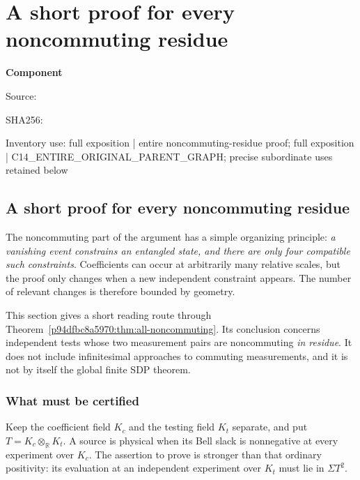 \chapter{A short proof for every noncommuting residue}
\label{component:p2c3fc22497a5}
\noindent\textbf{Component }\par
{\small\noindent Source: \par}
{\small\noindent SHA256: \par}
{\small\noindent Inventory use: full exposition | entire noncommuting-residue proof; full exposition | C14\_\allowbreak{}ENTIRE\_\allowbreak{}ORIGINAL\_\allowbreak{}PARENT\_\allowbreak{}GRAPH; precise subordinate uses retained below\par}
\medskip
\section{A short proof for every noncommuting residue}
\label{p2c3fc22497a5:sec:penpaper-noncommuting}

The noncommuting part of the argument has a simple organizing principle:
\emph{a vanishing event constrains an entangled state, and there are only four
compatible such constraints}.  Coefficients can occur at arbitrarily many
relative scales, but the proof only changes when a new independent constraint
appears.  The number of relevant changes is therefore bounded by geometry.

This section gives a short reading route through
Theorem~\ref{p94dfbc8a5970:thm:all-noncommuting}.  Its conclusion concerns independent tests
whose two measurement pairs are noncommuting \emph{in residue}.  It does not
include infinitesimal approaches to commuting measurements, and it is not by
itself the global finite SDP theorem.

\subsection{What must be certified}
Keep the coefficient field $K_c$ and the testing field $K_t$ separate, and put
$T=K_c\otimes_{\mathbb R}K_t$.  A source is physical when its Bell slack is
nonnegative at every experiment over $K_c$.  The assertion to prove is stronger
than that ordinary positivity: its evaluation at an independent experiment
over $K_t$ must lie in $\Sigma T^2$.

